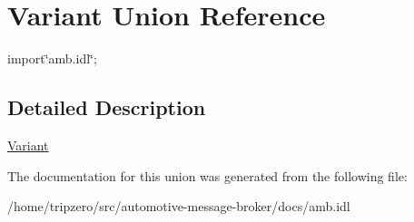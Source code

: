 \hypertarget{unionVariant}{\section{Variant Union Reference}
\label{unionVariant}
}


{\ttfamily import\char`\"{}amb.\-idl\char`\"{};}



\subsection{Detailed Description}
\hyperlink{unionVariant}{Variant} 

The documentation for this union was generated from the following file\-:\begin{DoxyCompactItemize}
\item 
/home/tripzero/src/automotive-\/message-\/broker/docs/amb.\-idl\end{DoxyCompactItemize}
